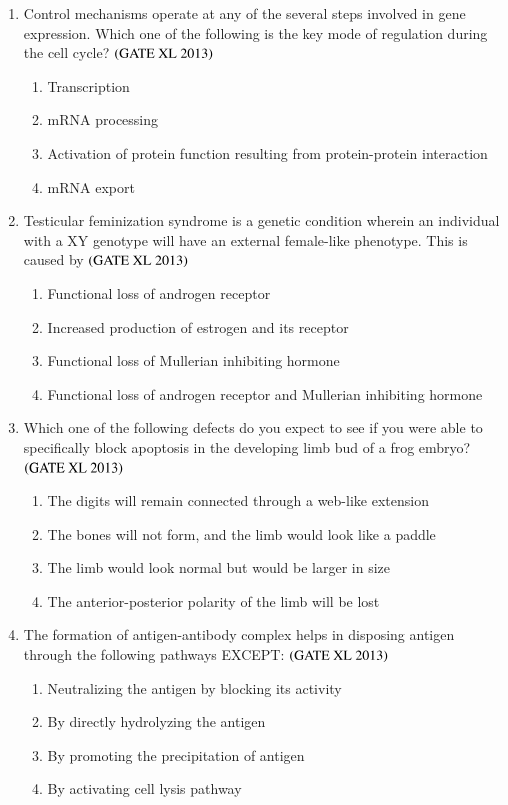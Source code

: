 \documentclass[journal]{IEEEtran}
\begin{document}
\begin{enumerate}
\item Control mechanisms operate at any of the several steps involved in gene expression. Which one of the following is the key mode of regulation during the cell cycle? \hfill $\left(\text{GATE XL 2013}\right)$
\begin{enumerate}
    \item Transcription
    \item mRNA processing
    \item Activation of protein function resulting from protein-protein interaction
    \item mRNA export
\end{enumerate}

\item Testicular feminization syndrome is a genetic condition wherein an individual with a XY genotype will have an external female-like phenotype. This is caused by \hfill $\left(\text{GATE XL 2013}\right)$
\begin{enumerate}
    \item Functional loss of androgen receptor
    \item Increased production of estrogen and its receptor
    \item Functional loss of Mullerian inhibiting hormone
    \item Functional loss of androgen receptor and Mullerian inhibiting hormone
\end{enumerate}

\item Which one of the following defects do you expect to see if you were able to specifically block apoptosis in the developing limb bud of a frog embryo? \hfill $\left(\text{GATE XL 2013}\right)$
\begin{enumerate}
    \item The digits will remain connected through a web-like extension
    \item The bones will not form, and the limb would look like a paddle
    \item The limb would look normal but would be larger in size
    \item The anterior-posterior polarity of the limb will be lost
\end{enumerate}

\item The formation of antigen-antibody complex helps in disposing antigen through the following pathways EXCEPT: \hfill $\left(\text{GATE XL 2013}\right)$
\begin{enumerate}
    \item Neutralizing the antigen by blocking its activity
    \item By directly hydrolyzing the antigen
    \item By promoting the precipitation of antigen
    \item By activating cell lysis pathway
\end{enumerate}


\end{enumerate}
\end{document}
